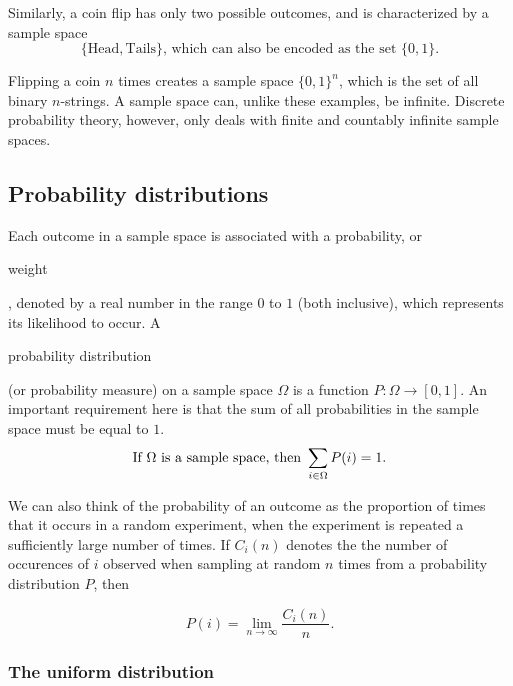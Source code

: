 \documentclass[11pt]{article}
\theoremstyle{plain}
\theoremstyle{definition}
\begin{document}
\noindent Similarly, a coin flip has only two possible outcomes, and is characterized by a sample space
\begin{displaymath}
  \{ \text{Head}, \text{Tails} \} \text{, which can also be encoded as the set } \{ 0, 1 \}.
\end{displaymath}

\noindent Flipping a coin $ n $ times creates a sample space $ \{0, 1\}^n $,
which is the set of all binary $ n $-strings. A sample space can, unlike these
examples, be infinite. Discrete probability theory, however, only deals with 
finite and countably infinite sample spaces.

\subsection*{Probability distributions}

Each outcome in a sample space is associated with a probability, or
\begin{em}weight\end{em}, denoted by a real number in the range $0$ to $1$ (both
  inclusive), which represents its likelihood to occur. A \begin{em}probability distribution\end{em} (or probability measure) on a sample space $\Omega$ is a function $P : \Omega \rightarrow [0, 1]$. An important requirement here is that the sum of all probabilities in the sample space must be equal to $ 1 $.
\begin{displaymath}
  \text{If $ \Omega $ is a sample space, then } \sum_{i \in \Omega} P(i) = 1.
\end{displaymath}

\noindent We can also think of the probability of an outcome as the proportion of times that it occurs in a random experiment, when the experiment is repeated a sufficiently large number of times. If $ C_i(n) $ denotes the the number of occurences of $ i $ observed when sampling at random $ n $ times from a probability distribution $ P $, then

\begin{displaymath}
  \displaystyle P(i) = \lim_{n\to \infty} \frac{C_i(n)}{n} .
\end{displaymath}

\subsubsection*{The uniform distribution}
\end{document}

